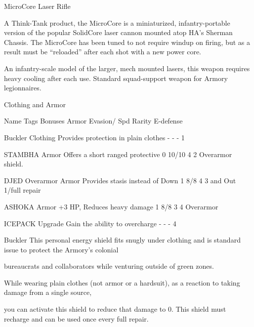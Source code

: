 MicroCore Laser Rifle  

                                                                                                                     


A Think-Tank product, the MicroCore is a miniaturized, infantry-portable version of the popular SolidCore  
laser cannon mounted atop HA’s Sherman Chassis. The MicroCore has been tuned to not require windup  
on firing, but as a result must be “reloaded” after each shot with a new power core.   

An infantry-scale model of the larger, mech mounted lasers, this weapon requires heavy cooling after each  
use. Standard squad-support weapon for Armory legionnaires.
 

                                                 Clothing and Armor  

  Name                  Tags        Bonuses                                    Armor      Evasion/       Spd    Rarity 
                                                                                          E-defense 

 Buckler                Clothing    Provides protection in plain clothes       -          -              -      1 

 STAMBHA               Armor        Offers a short ranged protective            0          10/10          4      2 
  Overarmor                         shield. 

 DJED Overarmor    Armor            Provides stasis instead of Down            1          8/8            4      3 
                                    and Out 1/full repair 

 ASHOKA                Armor        +3 HP, Reduces heavy damage                1          8/8            3      4 
  Overarmor 

 ICEPACK                Upgrade     Gain the ability to overcharge             -          -              -      4 

Buckler  
This personal energy shield fits snugly under clothing and is standard issue to protect the Armory’s colonial  

bureaucrats and collaborators while venturing outside of green zones.   

While wearing plain clothes (not armor or a hardsuit), as a reaction to taking damage from a single source,  

you can activate this shield to reduce that damage to 0. This shield must recharge and can be used once  
every full repair.
 

